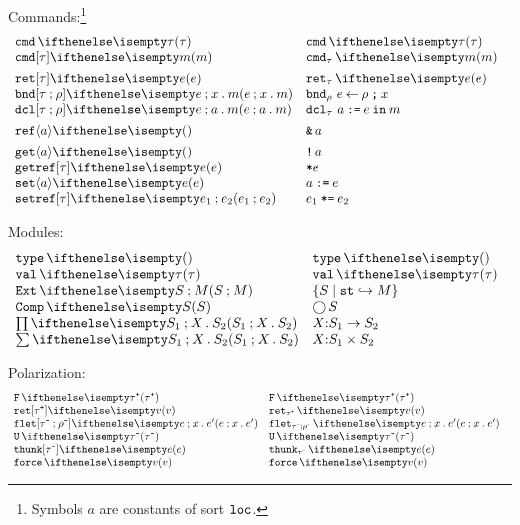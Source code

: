 \documentclass[11pt,twoside]{article}
\begin{document}
Commands:\footnote{Symbols $a$ are constants of sort $\texttt{loc}$.}
\begin{displaymath}
  \begin{array}{l@{\quad}l@{\quad}l}
    \cmdty{\tau}  & \cmdty*{\tau} \\
    \cmdex[\tau]{m} & \cmdex*{m} \\[1ex]
    \retcmd[\tau]{e} & \retcmd*{e} \\
    \bndcmd{e}{x}{m} & \bndcmd*{e}{x}{m} \\
    \dclcmd{e}{a}{m} & \dclcmd*{e}{a}{m} \\[1ex]
    \refex{a} & \refex*{a} \\[1ex]
    \getcmd{a} & \getcmd*{a} \\
    \getrefcmd[\tau]{e} & \getrefcmd*{e} \\
    \setcmd{a}{e} & \setcmd*{a}{e} \\
    \setrefcmd[\tau]{e_1}{e_2} & \setrefcmd*[\tau]{e_1}{e_2}
 \end{array}
\end{displaymath}

Modules:
\begin{displaymath}
  \begin{array}{l@{\quad}l@{\quad}l}
    \univsg  & \univsg* \\
    \valmod{\tau} & \valmod*{\tau} \\
    \extsg{S}{M} & \extsg*{S}{M} \\
    \compsg{S}  & \compsg*{S} \\
    \pisg{S_1}{X}{S_2} & \pisg*{S_1}{X}{S_2} \\
    \sigsg{S_1}{X}{S_2} & \sigsg*{S_1}{X}{S_2}
  \end{array}
\end{displaymath}

Polarization:
\begin{displaymath}
  \begin{array}{l@{\quad}l@{\quad}l}
    \freety{\posty{\tau}}   & \freety*{\posty{\tau}} \\
    \freeex[\posty{\tau}]{v} & \freeex*[\posty{\tau}]{v} \\
    \fletex[\negty{\tau}][\negty{\rho}]{e}{x}{e'} & \fletex*{e}{x}{e'} \\
    \thunkty{\negty{\tau}}  & \thunkty*{\negty{\tau}} \\
    \thunkex[\negty{\tau}]{e} & \thunkex*{e} \\
    \forceex{v}   & \forceex*{v}
  \end{array}
\end{displaymath}
\end{document}
